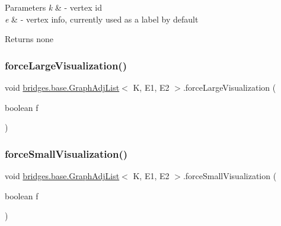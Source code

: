 \begin{DoxyParams}{Parameters}
{\em k} & -\/ vertex id \\
\hline
{\em e} & -\/ vertex info, currently used as a label by default\\
\hline
\end{DoxyParams}
\begin{DoxyReturn}{Returns}
none 
\end{DoxyReturn}
\mbox{\label{classbridges_1_1base_1_1_graph_adj_list_a0e2dff032458bb03cb778b571ddcc9b6}} 
\subsubsection{\texorpdfstring{forceLargeVisualization()}{forceLargeVisualization()}}
{\footnotesize\ttfamily void \mbox{\hyperlink{classbridges_1_1base_1_1_graph_adj_list}{bridges.\+base.\+Graph\+Adj\+List}}$<$ K, E1, E2 $>$.force\+Large\+Visualization (\begin{DoxyParamCaption}\item[{boolean}]{f }\end{DoxyParamCaption})}

\mbox{\label{classbridges_1_1base_1_1_graph_adj_list_ae14e51214742db0c4dab26c1d409f4ed}} 
\subsubsection{\texorpdfstring{forceSmallVisualization()}{forceSmallVisualization()}}
{\footnotesize\ttfamily void \mbox{\hyperlink{classbridges_1_1base_1_1_graph_adj_list}{bridges.\+base.\+Graph\+Adj\+List}}$<$ K, E1, E2 $>$.force\+Small\+Visualization (\begin{DoxyParamCaption}\item[{boolean}]{f }\end{DoxyParamCaption})}

